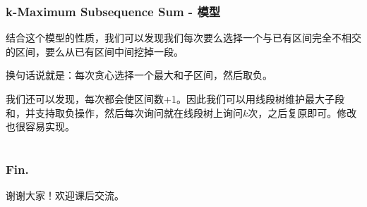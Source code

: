 \documentclass[11pt,dvipsnames,table]{beamer}
\begin{document}
{
\begin{frame}
	\frametitle{k-Maximum Subsequence Sum - 模型}
	结合这个模型的性质，我们可以发现我们每次要么选择一个与已有区间完全不相交的区间，要么从已有区间中间挖掉一段。
	
	换句话说就是：每次贪心选择一个最大和子区间，然后取负。
	
	我们还可以发现，每次都会使区间数+1。因此我们可以用线段树维护最大子段和，并支持取负操作，然后每次询问就在线段树上询问$k$次，之后复原即可。修改也很容易实现。
\end{frame}

\appendix
\section{}
\begin{frame}
	\frametitle{Fin.}
	\centering
	\LARGE
	谢谢大家！欢迎课后交流。
\end{frame}
}
\end{document}

